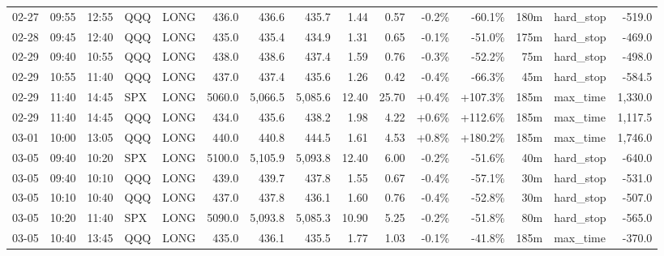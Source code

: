 \documentclass[11pt,a4paper,twoside]{article}
\begin{document}
\begin{landscape}
\begin{center}
\begin{longtable}{>{\color{txtmain}}l l l l l r r r r r r r r >{\color{txtmain}}l r}
02-27 & 09:55 & 12:55 & QQQ & LONG & 436.0 & 436.6 & 435.7 & 1.44 & 0.57 & \textcolor{lossred}{-0.2\%} & \textcolor{lossred}{-60.1\%} & 180m & hard\_stop & \textcolor{lossred}{-519.0} \\
02-28 & 09:45 & 12:40 & QQQ & LONG & 435.0 & 435.4 & 434.9 & 1.31 & 0.65 & \textcolor{lossred}{-0.1\%} & \textcolor{lossred}{-51.0\%} & 175m & hard\_stop & \textcolor{lossred}{-469.0} \\
02-29 & 09:40 & 10:55 & QQQ & LONG & 438.0 & 438.6 & 437.4 & 1.59 & 0.76 & \textcolor{lossred}{-0.3\%} & \textcolor{lossred}{-52.2\%} & 75m & hard\_stop & \textcolor{lossred}{-498.0} \\
02-29 & 10:55 & 11:40 & QQQ & LONG & 437.0 & 437.4 & 435.6 & 1.26 & 0.42 & \textcolor{lossred}{-0.4\%} & \textcolor{lossred}{-66.3\%} & 45m & hard\_stop & \textcolor{lossred}{-584.5} \\
02-29 & 11:40 & 14:45 & SPX & LONG & 5060.0 & 5,066.5 & 5,085.6 & 12.40 & 25.70 & \textcolor{wingreen}{+0.4\%} & \textcolor{wingreen}{+107.3\%} & 185m & max\_time & \textcolor{wingreen}{1,330.0} \\
02-29 & 11:40 & 14:45 & QQQ & LONG & 434.0 & 435.6 & 438.2 & 1.98 & 4.22 & \textcolor{wingreen}{+0.6\%} & \textcolor{wingreen}{+112.6\%} & 185m & max\_time & \textcolor{wingreen}{1,117.5} \\
03-01 & 10:00 & 13:05 & QQQ & LONG & 440.0 & 440.8 & 444.5 & 1.61 & 4.53 & \textcolor{wingreen}{+0.8\%} & \textcolor{wingreen}{+180.2\%} & 185m & max\_time & \textcolor{wingreen}{1,746.0} \\
03-05 & 09:40 & 10:20 & SPX & LONG & 5100.0 & 5,105.9 & 5,093.8 & 12.40 & 6.00 & \textcolor{lossred}{-0.2\%} & \textcolor{lossred}{-51.6\%} & 40m & hard\_stop & \textcolor{lossred}{-640.0} \\
03-05 & 09:40 & 10:10 & QQQ & LONG & 439.0 & 439.7 & 437.8 & 1.55 & 0.67 & \textcolor{lossred}{-0.4\%} & \textcolor{lossred}{-57.1\%} & 30m & hard\_stop & \textcolor{lossred}{-531.0} \\
03-05 & 10:10 & 10:40 & QQQ & LONG & 437.0 & 437.8 & 436.1 & 1.60 & 0.76 & \textcolor{lossred}{-0.4\%} & \textcolor{lossred}{-52.8\%} & 30m & hard\_stop & \textcolor{lossred}{-507.0} \\
03-05 & 10:20 & 11:40 & SPX & LONG & 5090.0 & 5,093.8 & 5,085.3 & 10.90 & 5.25 & \textcolor{lossred}{-0.2\%} & \textcolor{lossred}{-51.8\%} & 80m & hard\_stop & \textcolor{lossred}{-565.0} \\
03-05 & 10:40 & 13:45 & QQQ & LONG & 435.0 & 436.1 & 435.5 & 1.77 & 1.03 & \textcolor{lossred}{-0.1\%} & \textcolor{lossred}{-41.8\%} & 185m & max\_time & \textcolor{lossred}{-370.0} \\

\end{longtable}
\end{center}
\end{landscape}
\end{document}

